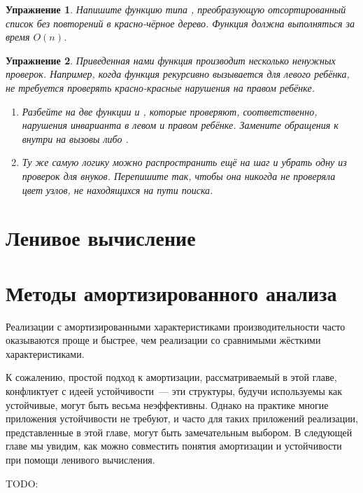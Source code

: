 \documentclass[aspectratio=169
  , xcolor={svgnames}
  , hyperref={ colorlinks,citecolor=DeepPink4
             , linkcolor=DarkRed,urlcolor=DarkBlue}
  , russian
  ]{beamer}
\theoremstyle{exerciseStyle1}
\newtheorem{exercise}{\textbf{Упражнение}}[section]
\begin{document}
\begin{frame}[fragile]{}
\begin{exercise}\label{ex:3.9}
  Напишите функцию  типа ,
  преобразующую отсортированный список без повторений в красно-чёрное
  дерево. Функция должна выполняться за время $O(n)$.
\end{exercise}

\begin{exercise}\label{ex:3.10}
  Приведенная нами функция  производит несколько
  ненужных проверок. Например, когда функция 
  рекурсивно вызывается для левого ребёнка, не требуется проверять
  красно-красные нарушения на правом ребёнке.
  \begin{enumerate}
    \item Разбейте  на две функции
     и , которые проверяют,
    соответственно, нарушения инварианта в левом и правом
    ребёнке. Замените обращения к  внутри
     на вызовы  либо .
    \item Ту же самую логику можно распространить ещё на шаг и убрать
    одну из проверок для внуков. Перепишите  так, чтобы
    она никогда не проверяла цвет узлов, не находящихся на пути поиска.
  \end{enumerate}
\end{exercise}
\end{frame}

\section{Ленивое вычисление}




\section{Методы амортизированного анализа}
\label{sc:5.1}


\begin{frame}[fragile]{}
Реализации с амортизированными
характеристиками производительности часто оказываются проще и быстрее,
чем реализации со сравнимыми жёсткими характеристиками.

К сожалению, простой подход к амортизации, рассматриваемый в этой
главе, конфликтует с идеей устойчивости~--- эти структуры, будучи
используемы как устойчивые, могут быть весьма неэффективны. Однако на
практике многие приложения устойчивости не требуют, и часто для таких
приложений реализации, представленные в этой главе, могут быть
замечательным выбором. В следующей главе мы увидим, как можно
совместить понятия амортизации и устойчивости при помощи ленивого
вычисления.

TODO:
\end{frame}
\end{document}
